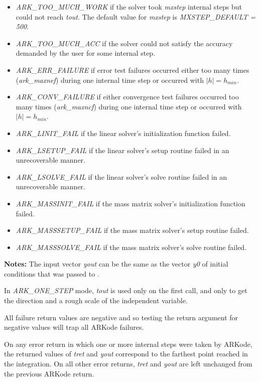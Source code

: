 \documentclass[letterpaper,10pt,english]{sphinxmanual}
\begin{document}
\begin{fulllineitems}
\begin{description}
\begin{itemize}
\item {} 
\emph{ARK\_TOO\_MUCH\_WORK} if the solver took \emph{mxstep} internal steps
but could not reach \emph{tout}.  The default value for \emph{mxstep} is
\emph{MXSTEP\_DEFAULT = 500}.

\item {} 
\emph{ARK\_TOO\_MUCH\_ACC} if the solver could not satisfy the accuracy
demanded by the user for some internal step.

\item {} 
\emph{ARK\_ERR\_FAILURE} if error test failures occurred either too many
times (\emph{ark\_maxnef}) during one internal time step or occurred
with $|h| = h_{min}$.

\item {} 
\emph{ARK\_CONV\_FAILURE} if either convergence test failures occurred
too many times (\emph{ark\_maxncf}) during one internal time step or
occurred with $|h| = h_{min}$.

\item {} 
\emph{ARK\_LINIT\_FAIL} if the linear solver's initialization function failed.

\item {} 
\emph{ARK\_LSETUP\_FAIL} if the linear solver's setup routine failed in
an unrecoverable manner.

\item {} 
\emph{ARK\_LSOLVE\_FAIL} if the linear solver's solve routine failed in
an unrecoverable manner.

\item {} 
\emph{ARK\_MASSINIT\_FAIL} if the mass matrix solver's
initialization function failed.

\item {} 
\emph{ARK\_MASSSETUP\_FAIL} if the mass matrix solver's setup routine
failed.

\item {} 
\emph{ARK\_MASSSOLVE\_FAIL} if the mass matrix solver's solve routine
failed.

\end{itemize}

\end{description}

\textbf{Notes:} The input vector \emph{yout} can be the same as the vector
\emph{y0} of initial conditions that was passed to {\hyperref[c_interface/User_callable:ARKodeInit]{}}.

In \emph{ARK\_ONE\_STEP} mode, \emph{tout} is used only on the first call, and
only to get the direction and a rough scale of the independent
variable.

All failure return values are negative and so testing the return
argument for negative values will trap all ARKode failures.

On any error return in which one or more internal steps were taken
by ARKode, the returned values of \emph{tret} and \emph{yout} correspond to
the farthest point reached in the integration. On all other error
returns, \emph{tret} and \emph{yout} are left unchanged from the previous
ARKode return.

\end{fulllineitems}
\end{document}
